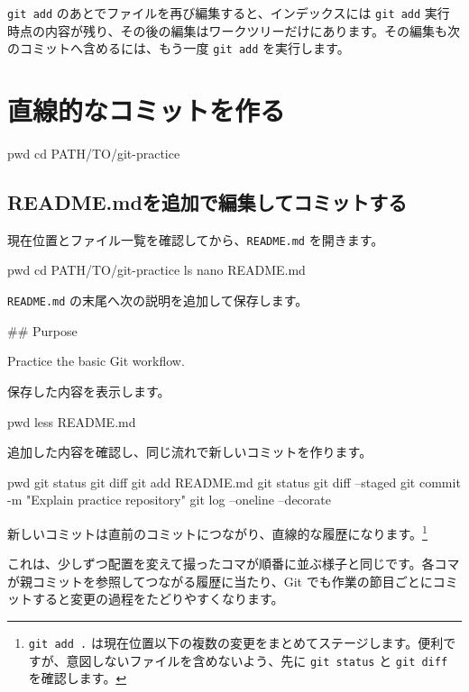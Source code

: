 \documentclass[a4paper,11pt]{jlreq}
\newcommand{\cmd}[1]{\texttt{#1}}
\begin{document}
\cmd{git add} のあとでファイルを再び編集すると、インデックスには \cmd{git add} 実行時点の内容が残り、その後の編集はワークツリーだけにあります。その編集も次のコミットへ含めるには、もう一度 \cmd{git add} を実行します。

\section{直線的なコミットを作る}

\begin{codeblock}
pwd
cd PATH/TO/git-practice
\end{codeblock}

\subsection{README.mdを追加で編集してコミットする}

現在位置とファイル一覧を確認してから、\cmd{README.md} を開きます。

\begin{codeblock}
pwd
cd PATH/TO/git-practice
ls
nano README.md
\end{codeblock}

\cmd{README.md} の末尾へ次の説明を追加して保存します。

\begin{codeblock}
## Purpose

Practice the basic Git workflow.
\end{codeblock}

保存した内容を表示します。

\begin{codeblock}
pwd
less README.md
\end{codeblock}

追加した内容を確認し、同じ流れで新しいコミットを作ります。

\begin{codeblock}
pwd
git status
git diff
git add README.md
git status
git diff --staged
git commit -m "Explain practice repository"
git log --oneline --decorate
\end{codeblock}

新しいコミットは直前のコミットにつながり、直線的な履歴になります。\footnote{\cmd{git add .} は現在位置以下の複数の変更をまとめてステージします。便利ですが、意図しないファイルを含めないよう、先に \cmd{git status} と \cmd{git diff} を確認します。}

これは、少しずつ配置を変えて撮ったコマが順番に並ぶ様子と同じです。各コマが親コミットを参照してつながる履歴に当たり、Git でも作業の節目ごとにコミットすると変更の過程をたどりやすくなります。
\end{document}
